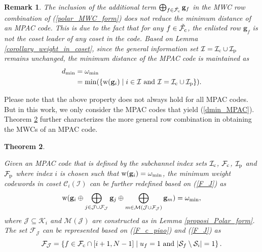 \documentclass[12pt, draftclsnofoot, peerreview, onecolumn]{IEEEtran}
\theoremstyle{noparent}
\newtheorem{theorem}{\textbf{Theorem}}
\newtheorem{remark}[theorem]{\textbf{Remark}}
\begin{document}
\begin{remark}
    \label{remark_7}
    The inclusion of the additional term $\bigoplus_{f \in \tilde{\mathcal{F}_{\rm c}}} \mathbf{g}_f$ 
    in the MWC row combination of (\ref{polar_MWC_form}) 
    does not reduce the minimum distance of an MPAC code.
    This is due to the fact that for any $f \in \tilde{\mathcal{F}_{\rm c}}$, 
    the enlisted row $\mathbf{g}_f$ is not the coset leader of any coset in the code.
    Based on Lemma \ref{corollary_weight_in_coset}, 
    since the general information set $\mathcal{I}=\mathcal{I}_{\rm c}\cup\mathcal{I}_{\rm p}$ remains unchanged,
    the minimum distance of the MPAC code is maintained as
    \begin{equation}
        \label{dmin_MPAC}
    \begin{aligned}        
        d_{\min}&=\omega_{\min}\\&=\min(\{{{\rm w}(\mathbf{g}_i}) \mid  i\in \mathcal{I}\ \text{and}\ \mathcal{I}=\mathcal{I}_{\rm c}\cup\mathcal{I}_{\rm p}\}).
    \end{aligned}
\end{equation}
\end{remark}

Please note that the above property does not always hold for all MPAC codes.
But in this work, we only consider the MPAC codes that yield (\ref{dmin_MPAC}).
Theorem \ref{theorem_MPAC_form} further characterizes the more
general row combination in obtaining the MWCs of an MPAC code. 


\begin{theorem}
    \label{theorem_MPAC_form}
    
    Given an MPAC code that is defined by the subchannel index sets $\mathcal{I}_{\rm c}$, $\mathcal{F}_{\rm c}$, $\mathcal{I}_{\rm p}$ and $\mathcal{F}_{\rm p}$ where index $i$ is chosen such that ${\rm w}(\mathbf{g}_i)=\omega_{\min}$,
    the minimum weight codewords in coset $\mathcal{C}_i(\mathcal{I})$ can be further redefined based on (\ref{F_J}) as
    \begin{equation}
        \label{MPAC_MWC_form}
        {\rm w}(\mathbf{g}_i \oplus \bigoplus_{j \in \mathcal{J} \cup \mathcal{F}_\mathcal{J}} \mathbf{g}_j \oplus \bigoplus_{m \in \mathcal{M}(\mathcal{J} \cup \mathcal{F}_\mathcal{J})} \mathbf{g}_m )=\omega_{\rm min},
    \end{equation}
    where $\mathcal{J} \subseteq \mathcal{K}_i$ and $\mathcal{M}(\mathcal{J})$ 
    are constructed as in Lemma \ref{proposi_Polar_form}.
    The set $\mathcal{F}_{\mathcal{J}}$ can be represented based on (\ref{F_c_piao}) and (\ref{F_J}) as
    $$\mathcal{F}_{\mathcal{J}}=\left\{f \in \mathcal{F}_{\rm c}\cap[i+1,N-1] \mid u_f=1\ \text{and}\ |\mathcal{S}_f \setminus \mathcal{S}_i|=1\right\}.$$
\end{theorem}
\end{document}
